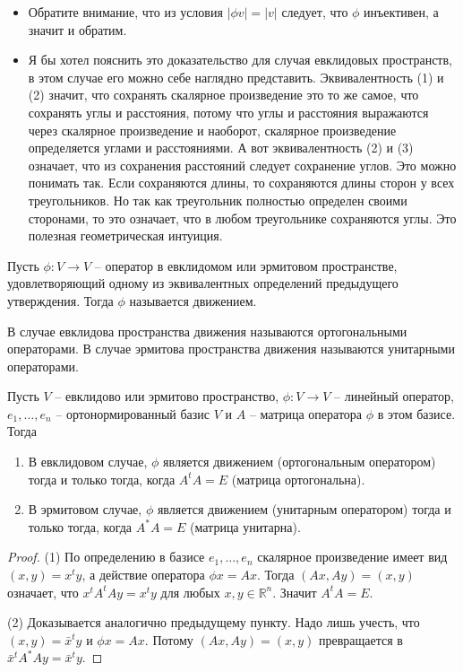 \begin{itemize}
\item Обратите внимание, что из условия $|\phi v| = |v|$ следует, что $\phi$ инъективен, а значит и обратим.

\item Я бы хотел пояснить это доказательство для случая евклидовых пространств, в этом случае его можно себе наглядно представить.
Эквивалентность (1) и (2) значит, что сохранять скалярное произведение это то же самое, что сохранять углы и расстояния, потому что углы и расстояния выражаются через скалярное произведение и наоборот, скалярное произведение определяется углами и расстояниями.
А вот эквивалентность (2) и (3) означает, что из сохранения расстояний следует сохранение углов.
Это можно понимать так.
Если сохраняются длины, то сохраняются длины сторон у всех треугольников.
Но так как треугольник полностью определен своими сторонами, то это означает, что в любом треугольнике сохраняются углы.
Это полезная геометрическая интуиция.
\end{itemize}


\begin{definition}
Пусть $\phi\colon V\to V$ -- оператор в евклидомом или эрмитовом пространстве, удовлетворяющий одному из эквивалентных определений предыдущего утверждения.
Тогда $\phi$ называется движением.


В случае евклидова пространства движения называются ортогональными операторами.
В случае эрмитова пространства движения называются унитарными операторами.
\end{definition}

\begin{claim}
\label{claim::MovementMatrix}
Пусть $V$ -- евклидово или эрмитово пространство, $\phi\colon V\to V$ -- линейный оператор, $e_1,\ldots,e_n$ -- ортонормированный базис $V$ и $A$ -- матрица оператора $\phi$ в этом базисе.
Тогда
\begin{enumerate}
\item В евклидовом случае, $\phi$ является движением (ортогональным оператором) тогда и только тогда, когда $A^t A = E$ (матрица ортогональна).

\item В эрмитовом случае, $\phi$ является движением (унитарным оператором) тогда и только тогда, когда $A^*A = E$ (матрица унитарна).
\end{enumerate}
\end{claim}
\begin{proof}
(1) По определению в базисе $e_1,\ldots,e_n$ скалярное произведение имеет вид $(x,y) = x^t y$, а действие оператора $\phi x = A x$.
Тогда $(Ax, Ay) = (x, y)$ означает, что $x^t A^t A y = x^t y$ для любых $x,y\in \mathbb R^n$.
Значит $A^t A = E$.

(2) Доказывается аналогично предыдущему пункту.
Надо лишь учесть, что $(x, y) = \bar x^t y$ и $\phi x = Ax$.
Потому $(Ax, Ay) = (x,y)$ превращается в $\bar x^t A^* A y = \bar x^t y$.
\end{proof}

